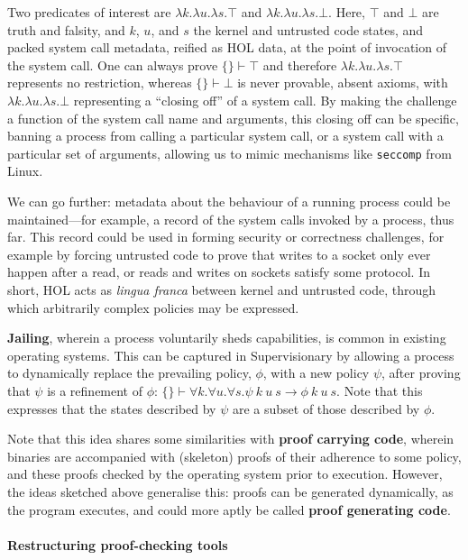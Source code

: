 \documentclass[sigplan, review]{acmart}
\newcommand{\deffont}[1]{\textbf{#1}}
\newcommand{\fall}[1]{\forall{#1}.}
\newcommand{\lam}[1]{\lambda{#1}.}
\begin{document}
Two predicates of interest are $\lam{k}\lam{u}\lam{s}\top$ and $\lam{k}\lam{u}\lam{s}\bot$.
Here, $\top$ and $\bot$ are truth and falsity, and $k$, $u$, and $s$ the kernel and untrusted code states, and packed system call metadata, reified as HOL data, at the point of invocation of the system call.
One can always prove $\{\} \vdash \top$ and therefore $\lam{k}\lam{u}\lam{s}\top$ represents no restriction, whereas $\{ \} \vdash \bot$ is never provable, absent axioms, with $\lam{k}\lam{u}\lam{s}\bot$ representing a ``closing off'' of a system call.
By making the challenge a function of the system call name and arguments, this closing off can be specific, banning a process from calling a particular system call, or a system call with a particular set of arguments, allowing us to mimic mechanisms like \texttt{seccomp} from Linux.

We can go further: metadata about the behaviour of a running process could be maintained---for example, a record of the system calls invoked by a process, thus far.
This record could be used in forming security or correctness challenges, for example by forcing untrusted code to prove that writes to a socket only ever happen after a read, or reads and writes on sockets satisfy some protocol.
In short, HOL acts as \emph{lingua franca} between kernel and untrusted code, through which arbitrarily complex policies may be expressed.

\deffont{Jailing}, wherein a process voluntarily sheds capabilities, is common in existing operating systems.
This can be captured in Supervisionary by allowing a process to dynamically replace the prevailing policy, $\phi$, with a new policy $\psi$, after proving that $\psi$ is a refinement of $\phi$: $\{\} \vdash \fall{k}\fall{u}\fall{s} \psi\ k\ u\ s \longrightarrow \phi\ k\ u\ s$.
Note that this expresses that the states described by $\psi$ are a subset of those described by $\phi$.

Note that this idea shares some similarities with \deffont{proof carrying code}, wherein binaries are accompanied with (skeleton) proofs of their adherence to some policy, and these proofs checked by the operating system prior to execution.
However, the ideas sketched above generalise this: proofs can be generated dynamically, as the program executes, and could more aptly be called \deffont{proof generating code}.

\paragraph{Restructuring proof-checking tools}
\end{document}
